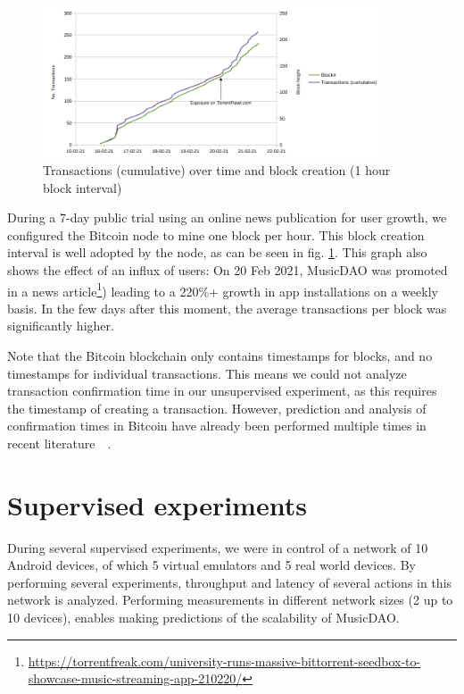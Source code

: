 \begin{figure}
    \centering
    \includegraphics[width=0.9\textwidth]{evaluation/transactions-torrentfreak.png}
    \caption{Transactions (cumulative) over time and block creation (1 hour block interval)}
    \label{fig:transactions}
\end{figure}
During a 7-day public trial using an online news publication for user growth, we configured the Bitcoin node to mine one block per hour. This block creation interval is well adopted by the node, as can be seen in fig. \ref{fig:transactions}. This graph also shows the effect of an influx of users: On 20 Feb 2021, MusicDAO was promoted in a news article\footnote{\url{https://torrentfreak.com/university-runs-massive-bittorrent-seedbox-to-showcase-music-streaming-app-210220/}}) leading to a 220\%+ growth in app installations on a weekly basis. In the few days after this moment, the average transactions per block was significantly higher.

Note that the Bitcoin blockchain only contains timestamps for blocks, and no timestamps for individual transactions. This means we could not analyze transaction confirmation time in our unsupervised experiment, as this requires the timestamp of creating a transaction. However, prediction and analysis of confirmation times in Bitcoin have already been performed multiple times in recent literature~\citep{kawase2017transaction}~\citep{koops2018predicting}.

\section{Supervised experiments}
During several supervised experiments, we were in control of a network of 10 Android devices, of which 5 virtual emulators and 5 real world devices. By performing several experiments, throughput and latency of several actions in this network is analyzed. Performing measurements in different network sizes (2 up to 10 devices), enables making predictions of the scalability of MusicDAO.

